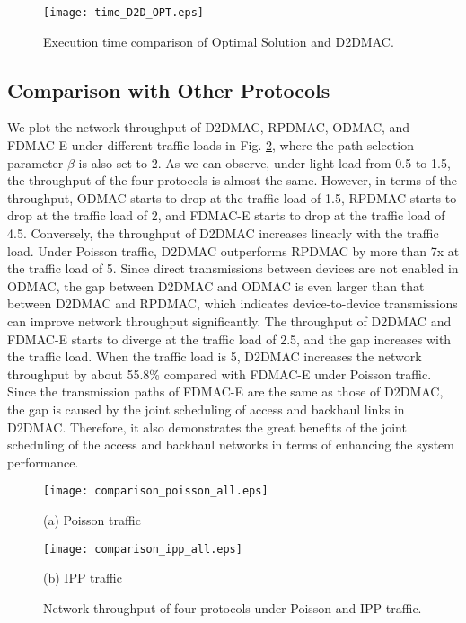 \documentclass[journal]{IEEEtran}
\begin{document}
\begin{figure}[htbp]
\begin{minipage}[t]{1\linewidth}
\centering
\texttt{[image: time\_D2D\_OPT.eps]}
\end{minipage}\caption{Execution time comparison of Optimal Solution and D2DMAC.}
\label{fig:time_opt} \vspace*{-3mm}
\end{figure}





\subsection{Comparison with Other Protocols}

We plot the network throughput of D2DMAC, RPDMAC, ODMAC, and FDMAC-E under different traffic loads in Fig.
\ref{fig:comparison}, where the path selection parameter $\beta$ is also set to 2. As we can
observe, under light load from 0.5 to 1.5, the throughput of the four protocols is almost the same.
However, in terms of the throughput, ODMAC starts to drop at the traffic load of 1.5, RPDMAC starts to drop at the traffic load of 2, and FDMAC-E starts to drop at the traffic load of 4.5. Conversely, the throughput of D2DMAC increases
linearly with the traffic load. Under Poisson traffic, D2DMAC outperforms RPDMAC by more than
7x at the traffic load of 5. Since direct transmissions between devices are not enabled in
ODMAC, the gap between D2DMAC and ODMAC is even larger than that between D2DMAC and RPDMAC, which
indicates device-to-device transmissions can improve network throughput significantly. The throughput of D2DMAC and FDMAC-E starts to diverge at the traffic load of 2.5, and the gap increases with the traffic load. When the traffic load is 5, D2DMAC increases the network throughput by about 55.8\% compared with FDMAC-E under Poisson traffic. Since the transmission paths of FDMAC-E are the same as those of D2DMAC, the gap is caused by the joint scheduling of access and backhaul links in D2DMAC. Therefore, it also demonstrates the great benefits of the joint scheduling of the access and backhaul
networks in terms of enhancing the system performance.








\begin{figure}[htbp]
\begin{minipage}[t]{0.5\linewidth}
\centering
\texttt{[image: comparison\_poisson\_all.eps]}
\centerline{\small (a) Poisson traffic}
\end{minipage}\begin{minipage}[t]{0.5\linewidth}
\centering
\texttt{[image: comparison\_ipp\_all.eps]}
\centerline{\small (b) IPP traffic}
\end{minipage}\caption{Network throughput of four protocols under Poisson and IPP traffic.}
\label{fig:comparison} \vspace*{-3mm}
\end{figure}
\end{document}
